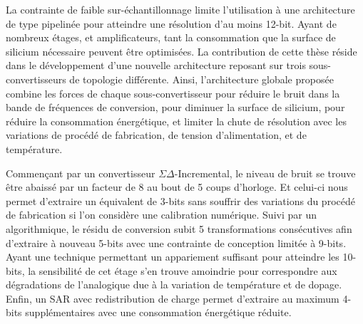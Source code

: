 \begin{mdframed}[linecolor=Prune,linewidth=1]
La contrainte de faible sur-échantillonnage limite l'utilisation à une architecture de type pipelinée pour atteindre une résolution d'au moins 12-bit. Ayant de nombreux étages, et amplificateurs, tant la consommation que la surface de silicium nécessaire peuvent être optimisées. La contribution de cette thèse réside dans le développement d'une nouvelle architecture reposant sur trois sous-convertisseurs de topologie différente. Ainsi, l'architecture globale proposée combine les forces de chaque sous-convertisseur pour réduire le bruit dans la bande de fréquences de conversion, pour diminuer la surface de silicium, pour réduire la consommation énergétique, et limiter la chute de résolution avec les variations de procédé de fabrication, de tension d'alimentation, et de température.

Commençant par un convertisseur $\Sigma\Delta$-Incremental, le niveau de bruit se trouve être abaissé par un facteur de 8 au bout de 5 coups d'horloge. Et celui-ci nous permet d'extraire un équivalent de 3-bits sans souffrir des variations du procédé de fabrication si l'on considère une calibration numérique. Suivi par un algorithmique, le résidu de conversion subit 5 transformations consécutives afin d'extraire à nouveau 5-bits avec une contrainte de conception limitée à 9-bits. Ayant une technique permettant un appariement suffisant pour atteindre les 10-bits, la sensibilité de cet étage s'en trouve amoindrie pour correspondre aux dégradations de l'analogique due à la variation de température et de dopage. Enfin, un SAR avec redistribution de charge permet d'extraire au maximum 4-bits supplémentaires avec une consommation énergétique réduite.


\end{mdframed}
